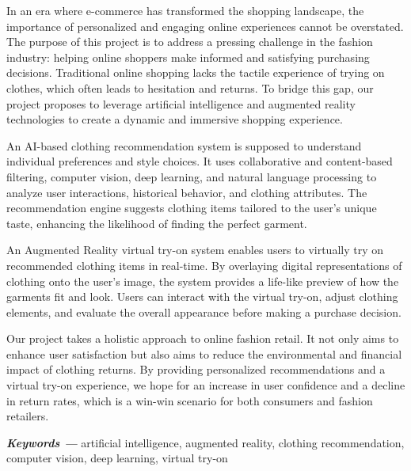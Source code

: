 
In an era where e-commerce has transformed the shopping landscape, the importance of personalized and engaging online experiences cannot be overstated. The purpose of this project is to address a pressing challenge in the fashion industry: helping online shoppers make informed and satisfying purchasing decisions. Traditional online shopping lacks the tactile experience of trying on clothes, which often leads to hesitation and returns. To bridge this gap, our project proposes to leverage artificial intelligence and augmented reality technologies to create a dynamic and immersive shopping experience.

An AI-based clothing recommendation system is supposed to understand individual preferences and style choices. It uses collaborative and content-based filtering, computer vision, deep learning, and natural language processing to analyze user interactions, historical behavior, and clothing attributes. The recommendation engine suggests clothing items tailored to the user's unique taste, enhancing the likelihood of finding the perfect garment.

An Augmented Reality virtual try-on system enables users to virtually try on recommended clothing items in real-time. By overlaying digital representations of clothing onto the user's image, the system provides a life-like preview of how the garments fit and look. Users can interact with the virtual try-on, adjust clothing elements, and evaluate the overall appearance before making a purchase decision.

Our project takes a holistic approach to online fashion retail. It not only aims to enhance user satisfaction but also aims to reduce the environmental and financial impact of clothing returns. By providing personalized recommendations and a virtual try-on experience, we hope for an increase in user confidence and a decline in return rates, which is a win-win scenario for both consumers and fashion retailers.

\textbf{\textit{Keywords ---}} artificial intelligence, augmented reality, clothing recommendation, computer vision, deep learning, virtual try-on